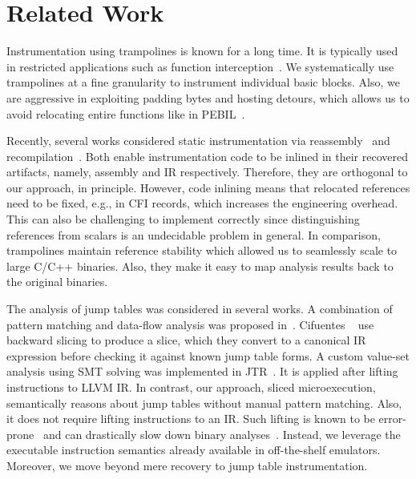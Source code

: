 \section{Related Work}
\label{sec:related-work}

Instrumentation using trampolines is known for a long time.
It is typically used in restricted applications such as function interception~\cite{MicrosoftDetours}.
We systematically use trampolines at a fine granularity to instrument individual basic blocks.
Also, we are aggressive in exploiting padding bytes and hosting detours, which allows us to avoid relocating entire functions like in PEBIL~\cite{Laurenzano2010}.


Recently, several works considered static instrumentation via reassembly~\cite{Wang2015,RetroWriteSP2020} and recompilation~\cite{Anand:EuroSys2013}.
Both enable instrumentation code to be inlined in their recovered artifacts, namely, assembly and IR respectively. 
Therefore, they are orthogonal to our approach, in principle. 
However, code inlining means that relocated references need to be
fixed, e.g., in CFI records, which increases the engineering overhead. 
This can also be challenging to implement correctly since distinguishing references from scalars is an undecidable problem in general. 
In comparison, trampolines maintain reference stability which allowed us to seamlessly scale to large C/C++ binaries. 
Also, they make it easy to map analysis results back to the original binaries.

The analysis of jump tables was considered in several works.
A combination of pattern matching and data-flow analysis was proposed in~\cite{BenKhadra2016,Meng:ISSTA2016}. 
Cifuentes \etal~\cite{Cifuentes1999} use backward slicing to produce a slice, which they convert to a canonical IR expression before checking it against known jump table forms.
A custom value-set analysis using SMT solving was implemented in JTR~\cite{Cojocar2017a}.
It is applied after lifting instructions to LLVM IR.
In contrast, our approach, sliced microexecution, semantically reasons about jump tables without manual pattern matching. 
Also, it does not require lifting instructions to an IR. 
Such lifting is known to be error-prone~\cite{BinIR:ASE17} and can drastically slow down binary analyses~\cite{QSYMYun2018}.
Instead, we leverage the executable instruction semantics already available in off-the-shelf emulators.
Moreover, we move beyond mere recovery to jump table instrumentation.


